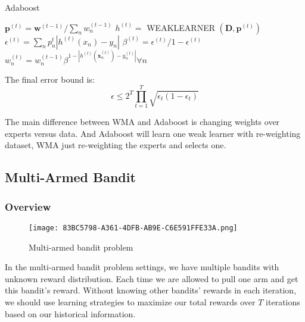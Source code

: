 \documentclass[11pt]{article}
\begin{document}
\begin{algorithm}
\caption{Adaboost}
\begin{algorithmic}[1]

        \State $\boldsymbol{p}^{(t)}=\boldsymbol{w}^{(t-1)} / \sum_{n} w_{n}^{(t-1)}$
        \State $h^{(t)}=$ WEAKLEARNER $\left(\boldsymbol{D}, \boldsymbol{p}^{(t)}\right)$ 
        \State $\epsilon^{(t)}=\sum_{n} p_{n}^{t}\left|h^{(t)}\left(x_{n}\right)-y_{n}\right|$
        \State $\beta^{(t)}=\epsilon^{(t)} / 1-\epsilon^{(t)}$
        \State $w_{n}^{(t)}=w_{n}^{(t-1)} \beta^{1-\left|h^{(t)}\left(\boldsymbol{x}_{n}^{(t)}\right)-y_{n}^{(t)}\right|} \forall n$ 
    \EndFor
\end{algorithmic}
\end{algorithm}

The final error bound is: 
\begin{equation}
    \epsilon \leq 2^{T} \prod_{t=1}^{T} \sqrt{\epsilon_{t}\left(1-\epsilon_{t}\right)}
\end{equation}

The main difference between WMA and Adaboost is changing weights over experts versus data. And Adaboost will learn one weak learner with re-weighting dataset, WMA just re-weighting the experts and selects one.

\subsection{Multi-Armed Bandit}

\subsubsection{Overview}

\begin{figure}[htbp]
    \centering
\texttt{[image: 83BC5798-A361-4DFB-AB9E-C6E591FFE33A.png]}
    \caption{Multi-armed bandit problem}
    \label{fig:bandit}
\end{figure} 

In the multi-armed bandit problem settings, we have multiple bandits with unknown reward distribution. Each time we are allowed to pull one arm and get this bandit's reward. Without knowing other bandits' rewards in each iteration, we should use learning strategies to maximize our total rewards over $T$ iterations based on our historical information. \\
\end{document}
